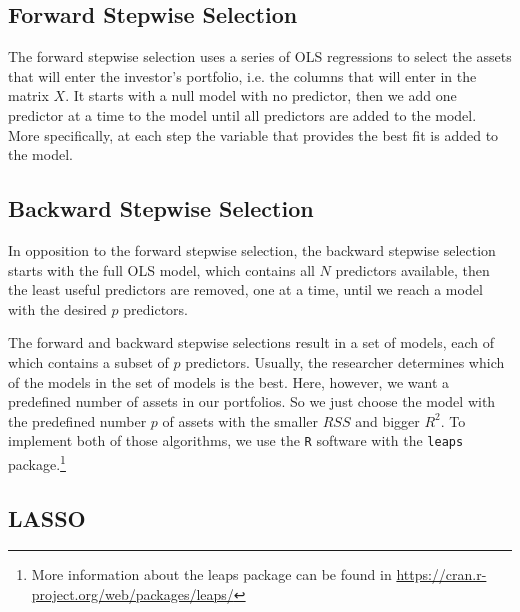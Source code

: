 \documentclass[preprint,authoryear,review,12pt]{elsarticle}
\begin{document}
\subsection{Forward Stepwise Selection}

The forward stepwise selection uses a series of OLS regressions to select the assets that will enter the investor's portfolio, i.e. the columns that will enter in the matrix $X$.
It starts with a null model with no predictor, then we add one predictor at a time to the model until all predictors are added to the model.
More specifically, at each step the variable that provides the best fit is added to the model.

\subsection{Backward Stepwise Selection}

In opposition to the forward stepwise selection, the backward stepwise selection starts with the full OLS model, which contains all $N$ predictors available, then the least useful predictors are removed, one at a time, until we reach a model with the desired $p$ predictors.

The forward and backward stepwise selections result in a set of models, each of which contains a subset of $p$ predictors.
Usually, the researcher determines which of the models in the set of models is the best.
Here, however, we want a predefined number of assets in our portfolios.
So we just choose the model with the predefined number $p$ of assets with the smaller $RSS$ and bigger $R^2$.
To implement both of those algorithms, we  use the \texttt{R} software with the \texttt{leaps} package.\footnote{More information about the leaps package can be found in \url{https://cran.r-project.org/web/packages/leaps/}}

\subsection{LASSO}
\end{document}
